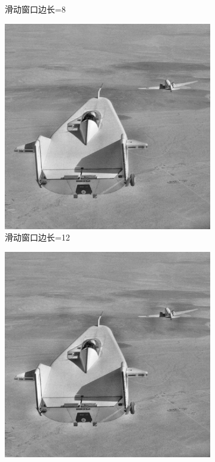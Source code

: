 \documentclass[a4paper]{ctexart}
\newcommand{\outwfour}{0.23\textwidth}
\begin{document}
\begin{spacing}{1.35}
\begin{figure}[htbp]
\begin{subfigure}[t]{\outwfour}
			\caption{滑动窗口边长=8}
		\end{subfigure}
		\begin{subfigure}[t]{\outwfour}
			\centering
			\includegraphics[width=\textwidth]{figure/1_tile_grid_size_12.png}
			\caption{滑动窗口边长=12}
		\end{subfigure}
		\begin{subfigure}[t]{\outwfour}
			\centering
			\includegraphics[width=\textwidth]{figure/1_tile_grid_size_16.png}

\end{subfigure}
\end{figure}
\end{spacing}
\end{document}
